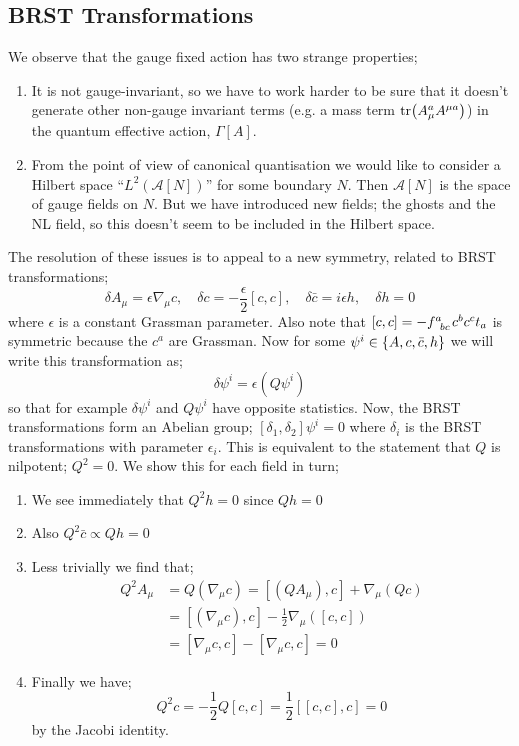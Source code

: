 \subsection{BRST Transformations}
We observe that the gauge fixed action has two strange properties;
\begin{enumerate}
\item It is not gauge-invariant, so we have to work harder to be sure that it doesn't generate other non-gauge invariant terms (e.g. a mass term $\tr(A^a_\mu A^{\mu a})$) in the quantum effective action, $\Gamma[A]$.
\item From the point of view of canonical quantisation we would like to consider a Hilbert space ``$L^2\left(\mathcal{A}[N]\right)$'' for some boundary $N$. Then $\mathcal{A}[N]$ is the space of gauge fields on $N$. But we have introduced new fields; the ghosts and the NL field, so this doesn't seem to be included in the Hilbert space. 
\end{enumerate}
The resolution of these issues is to appeal to a new symmetry, related to BRST transformations;
\begin{equation}
\delta A_\mu = \epsilon \nabla_\mu c, \quad \delta c = -\frac{\epsilon}{2}[c, c], \quad \delta \bar{c} = i\epsilon h, \quad \delta h = 0
\end{equation}
where $\epsilon$ is a constant Grassman parameter. Also note that $[c, c] = -f\indices{^{a}_{bc}}c^b c^c t_a$ is symmetric because the $c^a$ are Grassman. Now for some $\psi^i \in \set{A, c, \bar{c}, h}$ we will write this transformation as;
\begin{equation*}
\delta \psi^i = \epsilon (Q\psi^i)
\end{equation*}
so that for example $\delta \psi^i$ and $Q \psi^i$ have opposite statistics. Now, the BRST transformations form an Abelian group;
$[\delta_1, \delta_2]\psi^i = 0$
where $\delta_i$ is the BRST transformations with parameter $\epsilon_i$. This is equivalent to the statement that $Q$ is nilpotent; $Q^2 = 0$. We show this for each field in turn;
\begin{enumerate}
\item We see immediately that $Q^2 h = 0$ since $Qh = 0$
\item Also $Q^2 \bar{c} \propto Qh = 0$
\item Less trivially we find that;
\begin{align*}
Q^2 A_\mu &= Q\left(\nabla_\mu c\right) = \left[(Q A_\mu), c\right] + \nabla_\mu\left(Q c\right) \\
&= \left[(\nabla_\mu c), c\right] - \frac{1}{2}\nabla_\mu\left([c,c]\right) \\
&= [\nabla_\mu c, c] - [\nabla_\mu c, c] = 0
\end{align*}
\item Finally we have;
\begin{equation*}
Q^2 c = -\frac{1}{2}Q[c,c] = \frac{1}{2}\left[[c,c],c\right]  = 0
\end{equation*}
by the Jacobi identity.
\end{enumerate}

